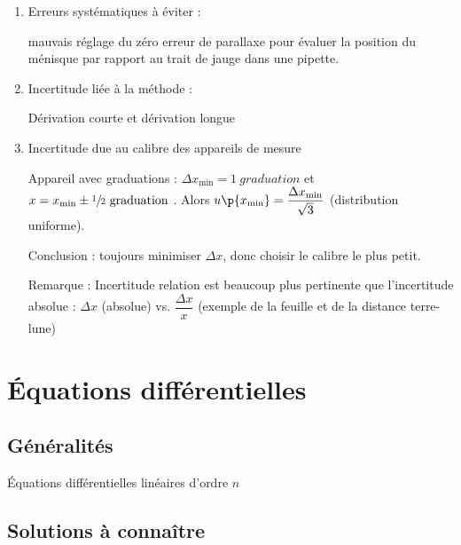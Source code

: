     \begin{enumerate}
        \item Erreurs systématiques à éviter :
        \begin{enumerate}
            \itast mauvais réglage du zéro 
            \itast erreur de parallaxe pour évaluer la position du ménisque par rapport au trait de jauge dans une pipette.
        \end{enumerate}
        
        \item Incertitude liée à la méthode :
        
        Dérivation courte et dérivation longue
        
         \item Incertitude due au calibre des appareils de mesure 
         
         Appareil avec graduations : $\Delta x_\text{min} = \SI{1}{graduation}$ et $x = x_\text{min} \pm \sfrac{1}{2} \ \text{graduation}$ . Alors $u\p{x_\text{min}} = \dfrac{\Delta x_\text{min}}{\sqrt{3}}$ (distribution uniforme).
         
         Conclusion : toujours minimiser $\Delta x$, donc choisir le calibre le plus petit. 
         
         Remarque : Incertitude relation est beaucoup plus pertinente que l'incertitude absolue : $\Delta x$ (absolue) vs. $\dfrac{\Delta x}{x}$ (exemple de la feuille et de la distance terre-lune)
    \end{enumerate}
    
    \section{Équations différentielles}
    
    \subsection{Généralités}
    
    \begin{definition}{Équations différentielles linéaires d'ordre $n$}{}
        
    \end{definition}
    
    \subsection{Solutions à connaître}
    
